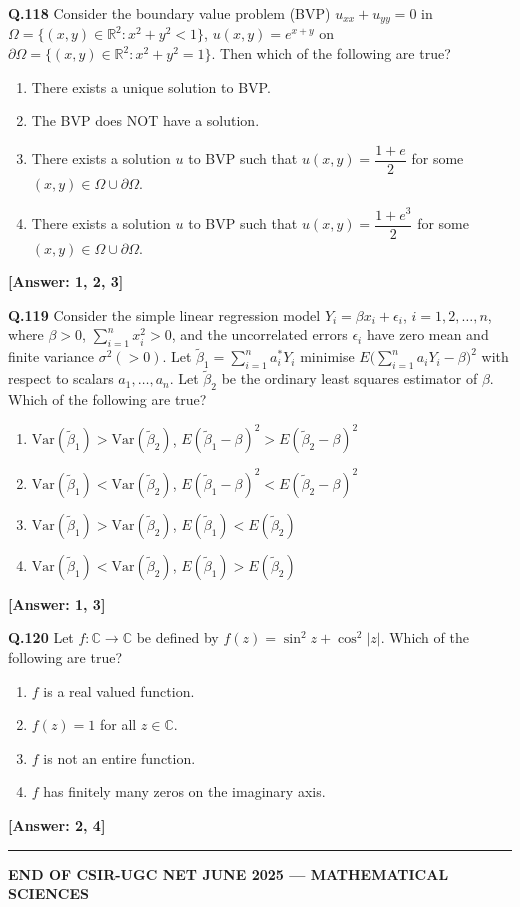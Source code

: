 \documentclass[12pt,a4paper]{article}
\newcommand{\ans}[1]{\quad\textcolor{anscolor}{\textbf{[Answer: #1]}}}
\begin{document}
\textbf{Q.118} Consider the boundary value problem (BVP) $u_{xx}+u_{yy}=0$ in $\Omega=\{(x,y)\in\mathbb{R}^2:x^2+y^2<1\}$, $u(x,y)=e^{x+y}$ on $\partial\Omega=\{(x,y)\in\mathbb{R}^2:x^2+y^2=1\}$. Then which of the following are true?
\begin{enumerate}[label=\arabic*.]
\item There exists a unique solution to BVP.
\item The BVP does NOT have a solution.
\item There exists a solution $u$ to BVP such that $u(x,y)=\dfrac{1+e}{2}$ for some $(x,y)\in\Omega\cup\partial\Omega$.
\item There exists a solution $u$ to BVP such that $u(x,y)=\dfrac{1+e^3}{2}$ for some $(x,y)\in\Omega\cup\partial\Omega$.
\end{enumerate}\ans{1, 2, 3}

\textbf{Q.119} Consider the simple linear regression model $Y_i=\beta x_i+\epsilon_i$, $i=1,2,\ldots,n$, where $\beta>0$, $\sum_{i=1}^nx_i^2>0$, and the uncorrelated errors $\epsilon_i$ have zero mean and finite variance $\sigma^2(>0)$. Let $\tilde{\beta}_1=\sum_{i=1}^na_i^*Y_i$ minimise $E\!\bigl(\sum_{i=1}^na_iY_i-\beta\bigr)^2$ with respect to scalars $a_1,\ldots,a_n$. Let $\tilde{\beta}_2$ be the ordinary least squares estimator of $\beta$. Which of the following are true?
\begin{enumerate}[label=\arabic*.]
\item $\text{Var}(\tilde{\beta}_1)>\text{Var}(\tilde{\beta}_2)$, $E(\tilde{\beta}_1-\beta)^2>E(\tilde{\beta}_2-\beta)^2$
\item $\text{Var}(\tilde{\beta}_1)<\text{Var}(\tilde{\beta}_2)$, $E(\tilde{\beta}_1-\beta)^2<E(\tilde{\beta}_2-\beta)^2$
\item $\text{Var}(\tilde{\beta}_1)>\text{Var}(\tilde{\beta}_2)$, $E(\tilde{\beta}_1)<E(\tilde{\beta}_2)$
\item $\text{Var}(\tilde{\beta}_1)<\text{Var}(\tilde{\beta}_2)$, $E(\tilde{\beta}_1)>E(\tilde{\beta}_2)$
\end{enumerate}\ans{1, 3}

\textbf{Q.120} Let $f:\mathbb{C}\to\mathbb{C}$ be defined by $f(z)=\sin^2z+\cos^2|z|$. Which of the following are true?
\begin{enumerate}[label=\arabic*.]
\item $f$ is a real valued function.
\item $f(z)=1$ for all $z\in\mathbb{C}$.
\item $f$ is not an entire function.
\item $f$ has finitely many zeros on the imaginary axis.
\end{enumerate}\ans{2, 4}

\vspace{1em}\hrule
\begin{center}
\textbf{END OF CSIR-UGC NET JUNE 2025 --- MATHEMATICAL SCIENCES}
\end{center}
\end{document}
